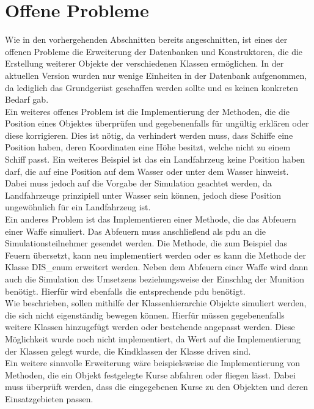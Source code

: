\section{Offene Probleme}\label{prob}
Wie in den vorhergehenden Abschnitten bereits angeschnitten, ist eines der offenen Probleme die Erweiterung der Datenbanken und Konstruktoren, die die Erstellung weiterer Objekte der verschiedenen Klassen ermöglichen. In der aktuellen Version wurden nur wenige Einheiten in der Datenbank aufgenommen, da lediglich das Grundgerüst geschaffen werden sollte und es keinen konkreten Bedarf gab. \\
Ein weiteres offenes Problem ist die Implementierung der Methoden, die die Position eines Objektes überprüfen und gegebenenfalls für ungültig erklären oder diese korrigieren.  Dies ist nötig, da verhindert werden muss, dass Schiffe eine Position haben, deren Koordinaten eine Höhe besitzt, welche nicht zu einem Schiff passt. Ein weiteres Beispiel ist das ein Landfahrzeug  keine Position haben darf, die auf eine Position auf dem Wasser oder unter dem Wasser hinweist. Dabei muss jedoch auf die Vorgabe der Simulation geachtet werden, da Landfahrzeuge prinzipiell unter Wasser sein können, jedoch diese Position ungewöhnlich für ein Landfahrzeug ist.\\
Ein anderes Problem ist das Implementieren einer Methode, die das Abfeuern einer Waffe simuliert. Das Abfeuern muss anschließend als \ac{pdu} an die Simulationsteilnehmer gesendet werden. Die Methode, die zum Beispiel das Feuern übersetzt, kann neu implementiert werden oder es kann die Methode der Klasse \glqq DIS\_enum\grqq{} erweitert werden. Neben dem Abfeuern einer Waffe wird dann auch die Simulation des Umsetzens beziehungsweise der Einschlag der Munition benötigt. Hierfür wird ebenfalls die entsprechende  \ac{pdu} benötigt.\\
Wie beschrieben, sollen mithilfe der Klassenhierarchie Objekte simuliert werden, die sich nicht eigenständig bewegen können. Hierfür müssen gegebenenfalls weitere Klassen hinzugefügt werden oder bestehende angepasst werden. Diese Möglichkeit wurde noch nicht implementiert, da Wert auf die Implementierung der Klassen gelegt wurde, die Kindklassen der Klasse  \glqq driven\grqq{} sind. \\
Ein weitere sinnvolle Erweiterung wäre beispielsweise die Implementierung von Methoden, die ein Objekt festgelegte Kurse abfahren oder fliegen lässt. Dabei muss überprüft werden, dass die eingegebenen Kurse zu den Objekten und deren Einsatzgebieten passen. 
